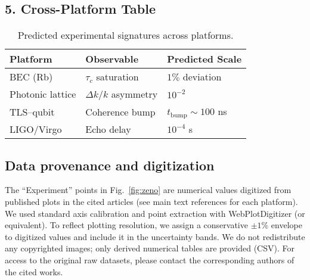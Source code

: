 \documentclass[aps,prl,twocolumn,nofootinbib]{revtex4-2}
\begin{document}
\subsection*{5. Cross-Platform Table}
\begin{table}[h]
\centering
\begin{tabular}{lll}
\hline
Platform & Observable & Predicted Scale \\
\hline
BEC (Rb) & $\tau_c$ saturation & $1\%$ deviation \\
Photonic lattice & $\Delta k/k$ asymmetry & $10^{-2}$ \\
TLS--qubit & Coherence bump & $t_{\text{bump}}\sim 100$ ns \\
LIGO/Virgo & Echo delay & $10^{-4}$ s \\
\hline
\end{tabular}
\caption{Predicted experimental signatures across platforms.}
\end{table}

\subsection*{Data provenance and digitization}
The “Experiment” points in Fig.~\ref{fig:zeno} are numerical values digitized from published plots in the cited articles (see main text references for each platform). We used standard axis calibration and point extraction with WebPlotDigitizer (or equivalent). To reflect plotting resolution, we assign a conservative $\pm 1\%$ envelope to digitized values and include it in the uncertainty bands. We do not redistribute any copyrighted images; only derived numerical tables are provided (CSV). For access to the original raw datasets, please contact the corresponding authors of the cited works.
\end{document}
